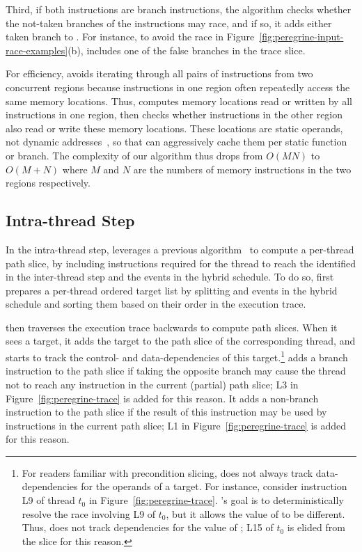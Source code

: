 Third, if both instructions are branch instructions, the algorithm checks
whether the not-taken branches of the instructions may race, and if so, it
adds either taken branch to .
For instance, to avoid the race in Figure~\ref{fig:peregrine-input-race-examples}(b),
\peregrine includes one of the false branches in the trace slice.

For efficiency, \peregrine avoids iterating through all pairs of instructions
from two concurrent regions because instructions in one region often
repeatedly access the same memory locations.  Thus, \peregrine computes memory
locations read or written by all instructions in one region, then checks
whether instructions in the other region also read or write these memory
locations.  These locations are static operands, not dynamic
addresses~\cite{rwset:tacas08}, so that \peregrine can aggressively cache them
per static function or branch.  The complexity of our algorithm thus drops from
$O(MN)$ to $O(M+N)$ where $M$ and $N$ are the numbers of memory
instructions in the two regions respectively.


\subsection{Intra-thread Step} \label{sec:peregrine-intrathread-slice}

In the intra-thread step, \peregrine leverages a previous
algorithm~\cite{castro:bouncer} to compute a per-thread path slice,
by including instructions required for the thread to reach the
 identified in the inter-thread step and the events in
the hybrid schedule.  To do so, \peregrine first prepares a per-thread ordered
target list by splitting  and events in the hybrid
schedule and sorting them based on their order in the execution trace.

\peregrine then traverses the execution trace backwards to compute path slices.
When it sees a target, it adds the target to the path slice of the
corresponding thread, and starts to track the control- and
data-dependencies of this target.\footnote{For readers familiar with
  precondition slicing, \peregrine does not always track data-dependencies for
  the operands of a target.  For instance, consider instruction
  L9 of thread $t_0$ in Figure~\ref{fig:peregrine-trace}.  \peregrine's goal is
  to deterministically resolve the race involving L9 of $t_0$, but it
  allows the value of  to be different.  Thus, \peregrine does not
  track dependencies for the value of ; L15 of $t_0$ is elided
  from the slice for this reason.}  \peregrine adds a branch
instruction to the path slice if taking the opposite branch may cause the
thread not to reach any instruction in the current (partial) path slice;
L3 in Figure~\ref{fig:peregrine-trace} is added for this reason.
It adds a non-branch instruction to the path slice if the result of this
instruction may be used by instructions in the current path slice;
L1 in Figure~\ref{fig:peregrine-trace} is added for this reason.

